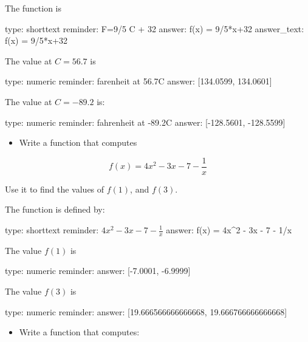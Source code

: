 \documentclass[12pt]{article}
\begin{document}
The function is

\begin{answer}
type: shorttext
reminder: F=9/5 C + 32
answer: f(x) = 9/5*x+32
answer_text: f(x) =  9/5*x+32 
\end{answer}

The value at $C=56.7$ is

\begin{answer}
    type: numeric
    reminder: farenheit at 56.7C
    answer: [134.0599, 134.0601]

\end{answer}

The value at $C=-89.2$ is:

\begin{answer}
    type: numeric
    reminder: fahrenheit at -89.2C
    answer: [-128.5601, -128.5599]

\end{answer}

\begin{itemize}
\itemsep1pt\parskip0pt
\item
  Write a function that computes
\end{itemize}

\[
f(x) = 4x^2 - 3x  - 7 - \frac{1}{x}
\]

Use it to find the values of $f(1)$, and $f(3)$.

The function is defined by:

\begin{answer}
type: shorttext
reminder: \( 4x^2 - 3x  - 7 - \frac{1}{x} \)
answer: f(x) = 4x^2 - 3x  - 7 - 1/x

\end{answer}

The value $f(1)$ is

\begin{answer}
    type: numeric
    reminder: 
    answer: [-7.0001, -6.9999]

\end{answer}

The value $f(3)$ is

\begin{answer}
    type: numeric
    reminder: 
    answer: [19.666566666666668, 19.666766666666668]

\end{answer}

\begin{itemize}
\itemsep1pt\parskip0pt
\item
  Write a function that computes:
\end{itemize}
\end{document}
